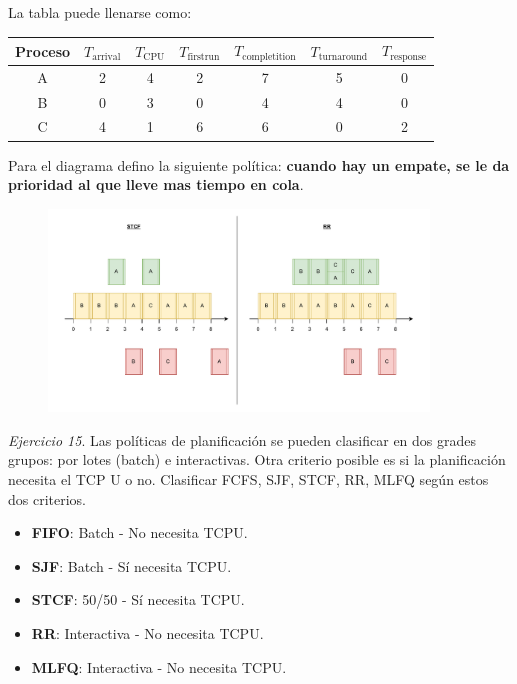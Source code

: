 \documentclass[12pt]{article}
\begin{document}
\begin{rta}
    La tabla puede llenarse como:
    \begin{center}
        \begin{tabular}{c|cc|cc|cc}
            Proceso & $T_{\text{arrival}}$ & $T_{\text{CPU}}$ & $T_{\text{firstrun}}$ & $T_{\text{completition}}$ & $T_{\text{turnaround}}$ & $T_{\text{response}}$ \\
            \hline
            A & 2 & 4 & 2 & 7 & 5 & 0 \\
            B & 0 & 3 & 0 & 4 & 4 & 0 \\
            C & 4 & 1 & 6 & 6 & 0 & 2 \\
            \hline
        \end{tabular}
    \end{center}
    Para el diagrama defino la siguiente política: \textbf{cuando hay un empate, se le da prioridad al que lleve mas tiempo en cola}.
\end{rta}

\begin{figure}[h]
    \centering
    \includegraphics[width=0.9\textwidth]{ej14.pdf}
\end{figure}

\noindent \textit{Ejercicio 15}. Las políticas de planificación se pueden clasificar en dos grades grupos: por lotes (batch) e interactivas. Otra criterio posible es si la planificación necesita el TCP U o no. Clasificar FCFS, SJF, STCF, RR, MLFQ según estos dos criterios.

\begin{rta}
    \begin{itemize}
        \item \textbf{FIFO}: Batch - No necesita TCPU.
        \item \textbf{SJF}: Batch - Sí necesita TCPU.
        \item \textbf{STCF}: 50/50 - Sí necesita TCPU.
        \item \textbf{RR}: Interactiva - No necesita TCPU.
        \item \textbf{MLFQ}: Interactiva - No necesita TCPU.
    \end{itemize}
\end{rta}
\end{document}
